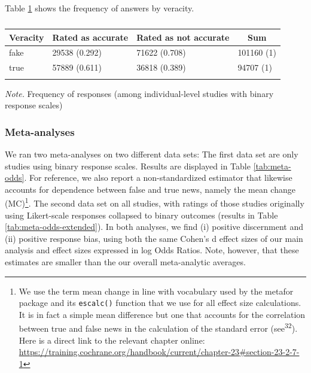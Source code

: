 \documentclass[
  doc,floatsintext]{apa6}
\begin{document}
Table \ref{tab:frequency} shows the frequency of answers by veracity.

\begin{table}[tbp]

\begin{center}
\begin{threeparttable}

\caption{\label{tab:frequency}}

\begin{tabular}{llll}
\toprule
Veracity & \multicolumn{1}{c}{Rated as accurate} & \multicolumn{1}{c}{Rated as not accurate} & \multicolumn{1}{c}{Sum}\\
\midrule
fake & 29538 (0.292) & 71622 (0.708) & 101160 (1)\\
true & 57889 (0.611) & 36818 (0.389) & 94707 (1)\\
\bottomrule
\addlinespace
\end{tabular}

\begin{tablenotes}[para]
\normalsize{\textit{Note.} Frequency of responses (among individual-level studies with binary response scales)}
\end{tablenotes}

\end{threeparttable}
\end{center}

\end{table}

\subsubsection{Meta-analyses}\label{meta-analyses}

We ran two meta-analyses on two different data sets: The first data set are only studies using binary response scales. Results are displayed in Table \ref{tab:meta-odds}. For reference, we also report a non-standardized estimator that likewise accounts for dependence between false and true news, namely the mean change (MC)\footnote{We use the term mean change in line with vocabulary used by the metafor package and its \texttt{escalc()} function that we use for all effect size calculations. It is in fact a simple mean difference but one that accounts for the correlation between true and false news in the calculation of the standard error (see\textsuperscript{32}). Here is a direct link to the relevant chapter online: \url{https://training.cochrane.org/handbook/current/chapter-23\#section-23-2-7-1}}. The second data set on all studies, with ratings of those studies originally using Likert-scale responses collapsed to binary outcomes (results in Table \ref{tab:meta-odds-extended}). In both analyses, we find (i) positive discernment and (ii) positive response bias, using both the same Cohen's d effect sizes of our main analysis and effect sizes expressed in log Odds Ratios. Note, however, that these estimates are smaller than the our overall meta-analytic averages.
\end{document}

